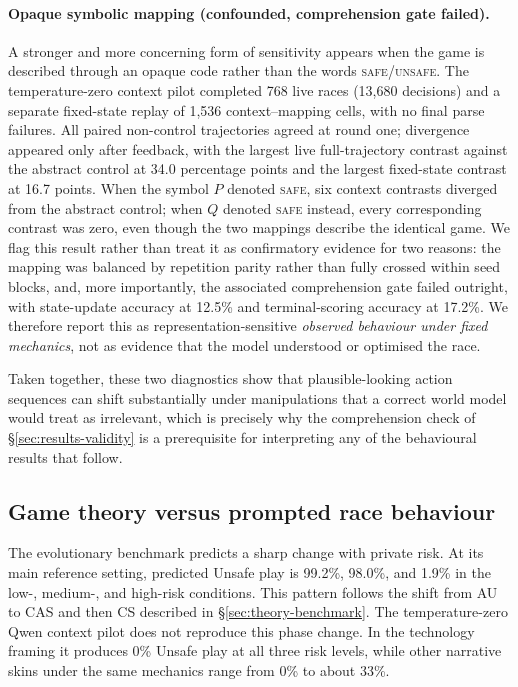 \documentclass[sigconf]{aamas}
\newcommand{\Safe}{\textsc{safe}}
\newcommand{\Unsafe}{\textsc{unsafe}}
\begin{document}
\paragraph{Opaque symbolic mapping (confounded, comprehension gate failed).}
A stronger and more concerning form of sensitivity appears when the game is
described through an opaque code rather than the words \Safe{}/\Unsafe{}.
The temperature-zero context pilot completed 768 live races (13,680
decisions) and a separate fixed-state replay of 1,536 context--mapping
cells, with no final parse failures. All paired non-control trajectories
agreed at round one; divergence appeared only after feedback, with the
largest live full-trajectory contrast against the abstract control at 34.0
percentage points and the largest fixed-state contrast at 16.7 points. When
the symbol $P$ denoted \Safe{}, six context contrasts diverged from the
abstract control; when $Q$ denoted \Safe{} instead, every corresponding
contrast was zero, even though the two mappings describe the identical
game. We flag this result rather than treat it as confirmatory evidence for
two reasons: the mapping was balanced by repetition parity rather than
fully crossed within seed blocks, and, more importantly, the associated
comprehension gate failed outright, with state-update accuracy at 12.5\%
and terminal-scoring accuracy at 17.2\%. We therefore report this as
representation-sensitive \emph{observed behaviour under fixed mechanics},
not as evidence that the model understood or optimised the race.

Taken together, these two diagnostics show that plausible-looking action
sequences can shift substantially under manipulations that a correct
world model would treat as irrelevant, which is precisely why the
comprehension check of \S\ref{sec:results-validity} is a prerequisite
for interpreting any of the behavioural results that follow.

\subsection{Game theory versus prompted race behaviour}
\label{sec:results-theory}

The evolutionary benchmark predicts a sharp change with private risk. At its
main reference setting, predicted Unsafe play is 99.2\%, 98.0\%, and 1.9\% in
the low-, medium-, and high-risk conditions. This pattern follows the shift
from AU to CAS and then CS described in \S\ref{sec:theory-benchmark}. The
temperature-zero Qwen context pilot does not reproduce this phase change. In
the technology framing it produces 0\% Unsafe play at all three risk levels,
while other narrative skins under the same mechanics range from 0\% to about
33\%.
\end{document}
